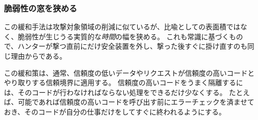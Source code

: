 \documentclass[uplatex]{jsarticle}
\def\label#1{}%
\begin{document}
\subsubsection{脆弱性の窓を狭める}\label{subsec:ch3-narrow-windows}

この緩和手法は攻撃対象領域の削減に似ているが、比喩としての表面積ではなく、脆弱性が生じうる実質的な\emph{時間}の幅を狭める。
これも常識に基づくもので、ハンターが撃つ直前にだけ安全装置を外し、撃った後すぐに掛け直すのも同じ理由からである。

この緩和策は、通常、信頼度の低いデータやリクエストが信頼度の高いコードとやり取りする信頼境界に適用する。
信頼度の高いコードをうまく隔離するには、そのコードが行わなければならない処理をできるだけ少なくする。
たとえば、可能であれば信頼度の高いコードを呼び出す前にエラーチェックを済ませておき、そのコードが自分の仕事だけをしてすぐに終われるようにする。
\end{document}
